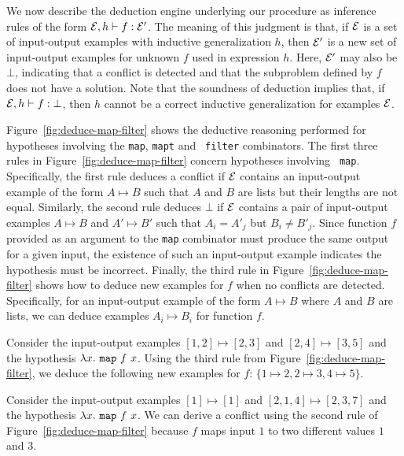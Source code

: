 We  now describe the deduction engine underlying our procedure as
inference rules of the form $
\mathcal{E}, h \vdash f: \mathcal{E}' $.
The meaning of this judgment is that, if $\mathcal{E}$ is a set of input-output
examples with inductive generalization $h$, then $\mathcal{E}'$ is a new set of
input-output examples for unknown $f$ used in expression $h$. Here,
$\mathcal{E}'$ may also be $\bot$, indicating that a conflict is detected and
that the subproblem defined by $f$ does not have a
solution. Note that the soundness of deduction implies that, if $\mathcal{E}, h
\vdash f: \bot$, then $h$ cannot be a correct inductive generalization
for examples $\mathcal{E}$.

%

Figure~\ref{fig:deduce-map-filter} shows the deductive reasoning
performed for hypotheses involving the {\tt map}, {\tt mapt} and {\tt
  filter} combinators. The first three rules in
Figure~\ref{fig:deduce-map-filter} concern hypotheses involving {\tt
  map}.  Specifically, the first rule deduces a conflict if $\mathcal{E}$
contains an input-output example of the form $A \mapsto B$ such
that $A$ and $B$ are lists but their lengths are not equal.
Similarly, the second rule deduces $\bot$ if $\mathcal{E}$ contains a pair of
input-output examples $A \mapsto B$ and $A' \mapsto B'$ such
that $A_i = A'_j$ but $B_i \neq B'_j$. Since function $f$ provided as
an argument to the {\tt map} combinator must produce the same output
for a given input, the existence of such an input-output example
indicates the hypothesis must be incorrect. Finally, the third rule in
Figure~\ref{fig:deduce-map-filter} shows how to deduce new examples
for $f$ when no conflicts are detected. Specifically, for an
input-output example of the form $A \mapsto B$ where $A$ and $B$
are lists, we can deduce examples $A_i \mapsto B_i$ for function
$f$.




\begin{example}
  Consider the input-output examples $[1, 2] \mapsto [2, 3]$ and $[2,
  4] \mapsto [3, 5]$ and the hypothesis $\lambda x. \ {\tt map} \ f \
  x$. Using the third rule from Figure~\ref{fig:deduce-map-filter}, we
  deduce the following new examples for $f$: $\{ 1 \mapsto 2, 2
  \mapsto 3, 4 \mapsto 5 \}$.
\end{example}

\begin{example}
  Consider the input-output examples $[1] \mapsto [1]$ and $[2,1,4]
  \mapsto [2, 3, 7]$ and the hypothesis $\lambda x. \ {\tt map} \ f \
  x$.  We can derive a conflict using the second rule of
  Figure~\ref{fig:deduce-map-filter} because $f$ maps  input $1$ to
  two different values $1$ and $3$.
\end{example}

